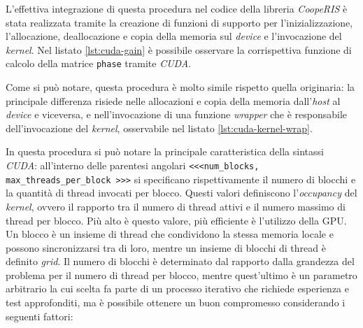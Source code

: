 L'effettiva integrazione di questa procedura nel codice della libreria \textit{CoopeRIS}
è stata realizzata tramite la creazione di funzioni di supporto per l'inizializzazione,
l'allocazione, deallocazione e copia della memoria sul \textit{device} e l'invocazione
del \textit{kernel}. Nel listato \ref{lst:cuda-gain} è possibile osservare la corrispettiva
funzione di calcolo della matrice \texttt{phase} tramite \textit{CUDA}.

\vspace{1em}

\vspace{1em}

Come si può notare, questa procedura è molto simile rispetto quella originaria:
la principale differenza risiede nelle allocazioni e copia della memoria dall'\textit{host}
al \textit{device} e viceversa, e nell'invocazione di una funzione \textit{wrapper}
che è responsabile dell'invocazione del \textit{kernel}, osservabile nel listato
\ref{lst:cuda-kernel-wrap}.

\vspace{1em}

\vspace{1em}

In questa procedura si può notare la principale caratteristica della sintassi \textit{CUDA}:
all'interno delle parentesi angolari \texttt{<<<num\_blocks, max\_threads\_per\_block
>>>} si specificano rispettivamente il numero di blocchi e la quantità di thread
invocati per blocco. Questi valori definiscono l'\textit{occupancy} del \textit{kernel},
ovvero il rapporto tra il numero di thread attivi e il numero massimo di thread
per blocco. Più alto è questo valore, più efficiente è l'utilizzo della GPU. Un blocco
è un insieme di thread che condividono la stessa memoria locale e possono sincronizzarsi
tra di loro, mentre un insieme di blocchi di thread è definito \textit{grid}. Il
numero di blocchi è determinato dal rapporto dalla grandezza del problema per il
numero di thread per blocco, mentre quest'ultimo è un parametro arbitrario la cui
scelta fa parte di un processo iterativo che richiede esperienza e test approfonditi,
ma è possibile ottenere un buon compromesso considerando i seguenti fattori:

